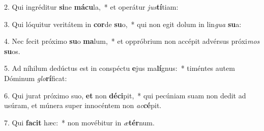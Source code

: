 2. Qui ingréditur \textbf{si}ne \textbf{má}\textbf{cu}la,~*  et operátur \textit{jus}\textbf{tí}tiam:\

3. Qui lóquitur veritátem in \textbf{cor}de \textbf{su}o,~*  qui non egit dolum in lin\textit{gua} \textbf{su}a:\

4. Nec fecit próximo \textbf{su}o \textbf{ma}lum,~*  et oppróbrium non accépit advérsus próxi\textit{mos} \textbf{su}os.\

5. Ad níhilum dedúctus est in conspéctu \textbf{e}jus ma\textbf{lí}gnus:~*  timéntes autem Dóminum \textit{glo}\textbf{rí}ficat:\

6. Qui jurat próximo suo, \textbf{et} non \textbf{dé}\textbf{ci}pit,~*  qui pecúniam suam non dedit ad usúram, et múnera super innocéntem non \textit{ac}\textbf{cé}pit.\

7. Qui \textbf{fa}\textbf{cit} hæc:~*  non movébitur in \textit{æ}\textbf{tér}num.\

